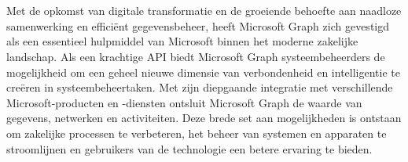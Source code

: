 
\chapter{}%
\label{ch:inleiding}

\begin{comment}
De inleiding moet de lezer net genoeg informatie verschaffen om het onderwerp te begrijpen en in te zien waarom de onderzoeksvraag de moeite waard is om te onderzoeken. In de inleiding ga je literatuurverwijzingen beperken, zodat de tekst vlot leesbaar blijft. Je kan de inleiding verder onderverdelen in secties als dit de tekst verduidelijkt. Zaken die aan bod kunnen komen in de inleiding~\autocite{Pollefliet2011}:

\begin{itemize}
  \item context, achtergrond => OK?
  \item afbakenen van het onderwerp => OK?
  \item verantwoording van het onderwerp, methodologie !!!
  \item probleemstelling !!!
  \item onderzoeksdoelstelling: !!! TODO !!!
  \item onderzoeksvraag: Is Microsoft Graph op dit moment klaar om de beheertaken die mogelijk waren met Azure AD graph over te nemen?
  \item \ldots 
\end{itemize}
\end{comment}


Met de opkomst van digitale transformatie en de groeiende behoefte aan naadloze samenwerking en efficiënt gegevensbeheer, heeft Microsoft Graph zich gevestigd als een essentieel hulpmiddel van Microsoft binnen het moderne zakelijke landschap. Als een krachtige \Ac{API} biedt Microsoft Graph systeembeheerders de mogelijkheid om een geheel nieuwe dimensie van verbondenheid en intelligentie te creëren in systeembeheertaken. Met zijn diepgaande integratie met verschillende Microsoft-producten en -diensten ontsluit Microsoft Graph de waarde van gegevens, netwerken en activiteiten. Deze brede set aan mogelijkheden is ontstaan om zakelijke processen te verbeteren, het beheer van systemen en apparaten te stroomlijnen en gebruikers van de technologie een betere ervaring te bieden. \\ 

